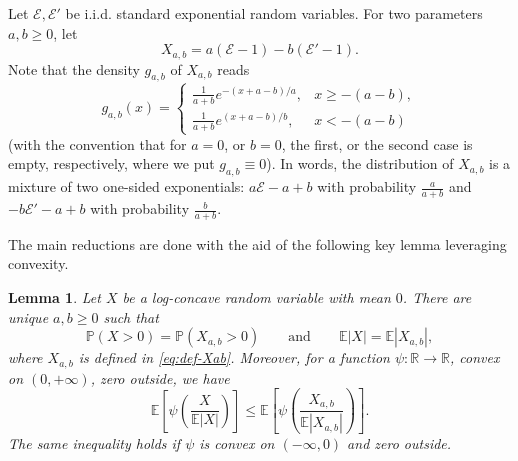 \documentclass[10pt]{amsart}
\newcommand{\E}{\mathbb{E}}
\newcommand{\1}{\textbf{1}}
\newcommand{\R}{\mathbb{R}}
\newcommand{\p}[1]{\mathbb{P}\left( #1 \right)}
\newcommand{\cE}{\mathcal{E}}
\newtheorem{lemma}[theorem]{Lemma}
\theoremstyle{remark}
\theoremstyle{definition}
\begin{document}
Let $\cE, \cE'$ be i.i.d. standard exponential random variables. For two parameters $a, b \geq 0$, let
\begin{equation}\label{eq:def-Xab}
X_{a,b} = a(\cE-1) - b(\cE'-1).
 \end{equation}
Note that the density $g_{a,b}$ of $X_{a,b}$ reads
\begin{equation}\label{eq:gab}
g_{a,b}(x) = \begin{cases}\frac{1}{a+b}e^{-(x+a-b)/a}, & x \geq -(a-b), \\ \frac{1}{a+b}e^{(x+a-b)/b}, & x < -(a-b) \end{cases}
\end{equation}
(with the convention that for $a= 0$, or $b = 0$, the first, or the second case is empty, respectively, where we put $g_{a,b} \equiv 0$). In words, the distribution of $X_{a,b}$ is a mixture of two one-sided exponentials: $a\cE-a+b$ with probability $\frac{a}{a+b}$ and $-b\cE'-a+b$ with probability $\frac{b}{a+b}$. 

The main reductions are done with the aid of the following key lemma leveraging convexity.

\begin{lemma}\label{lm:reduction}
Let $X$ be a log-concave random variable with mean $0$. There are unique $a, b \geq 0$ such that 
\begin{equation}\label{eq:constraints}
\p{X > 0} = \p{X_{a,b} > 0} \qquad \text{and} \qquad \E|X| = \E|X_{a,b}|,
\end{equation}
where $X_{a,b}$ is defined in \eqref{eq:def-Xab}.
Moreover, for a function $\psi\colon \R \to \R$, convex on $(0, + \infty)$, zero outside, we have
\begin{equation}\label{eq:sup-two-slopes}
\E\left[ \psi\left(\frac{X}{\E|X|}\right)\right] \leq  \E\left[ \psi\left(\frac{X_{a,b}}{\E|X_{a,b}|}\right)\right].
\end{equation}
The same inequality holds if $\psi$ is convex on $(-\infty, 0)$ and zero outside. 
\end{lemma}
\end{document}
